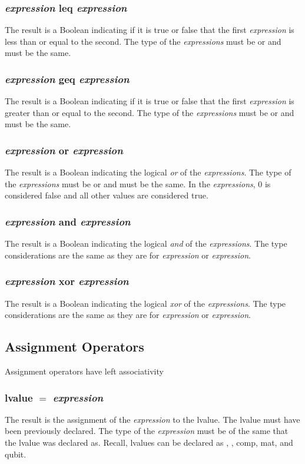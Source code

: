 \subsubsection{\textit{expression} leq \textit{expression}}
The result is a Boolean indicating if it is true or false that the first \textit{expression} is less than  or equal to the second. The type of the \textit{expressions} must be \integ or \float and must be the same. 
\subsubsection{\textit{expression} geq \textit{expression}}
The result is a Boolean indicating if it is true or false that the first \textit{expression} is greater than or equal to the second. The type of the \textit{expressions} must be \integ or \float and must be the same. 
\subsubsection{\textit{expression} or \textit{expression}}
The result is a Boolean indicating the logical \textit{or} of the \textit{expressions}. The type of the \textit{expressions} must be \integ or \float and must be the same. In the \textit{expressions}, 0 is considered \textsf{false} and all other values are considered \textsf{true}.
\subsubsection{\textit{expression} and \textit{expression}}
The result is a Boolean indicating the logical \textit{and} of the \textit{expressions}. The type considerations are the same as they are for \textit{expression} or \textit{expression}.
\subsubsection{\textit{expression} xor \textit{expression}}
The result is a Boolean indicating the logical \textit{xor} of the \textit{expressions}. The type considerations are the same as they are for \textit{expression} or \textit{expression}.
\subsection{Assignment Operators}
Assignment operators have left associativity
\subsubsection{lvalue $=$ \textit{expression}}
The result is the assignment of the \textit{expression} to the lvalue. The lvalue must have been previously declared. The type of the \textit{expression} must be of the same that the lvalue was declared as. Recall, lvalues can be declared as \integ, \float, comp, mat, and qubit.
